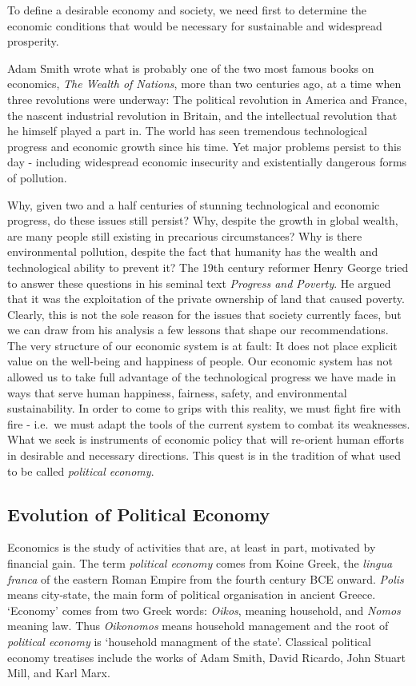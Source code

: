 \documentclass[]{tufte-handout}
\begin{document}
To define a desirable economy and society, we need first to determine
the economic conditions that would be necessary for sustainable and
widespread prosperity.

Adam Smith wrote what is probably one of the two most famous books on
economics, \emph{The Wealth of Nations}, more than two centuries ago, at
a time when three revolutions were underway: The political revolution in
America and France, the nascent industrial revolution in Britain, and
the intellectual revolution that he himself played a part in. The world
has seen tremendous technological progress and economic growth since his
time. Yet major problems persist to this day - including widespread
economic insecurity and existentially dangerous forms of pollution.

Why, given two and a half centuries of stunning technological and
economic progress, do these issues still persist? Why, despite the
growth in global wealth, are many people still existing in precarious
circumstances? Why is there environmental pollution, despite the fact
that humanity has the wealth and technological ability to prevent it?
The 19th century reformer Henry George tried to answer these questions
in his seminal text \emph{Progress and Poverty}. He argued that it was
the exploitation of the private ownership of land that caused poverty.
Clearly, this is not the sole reason for the issues that society
currently faces, but we can draw from his analysis a few lessons that
shape our recommendations. The very structure of our economic system is
at fault: It does not place explicit value on the well-being and
happiness of people. Our economic system has not allowed us to take full
advantage of the technological progress we have made in ways that serve
human happiness, fairness, safety, and environmental sustainability. In
order to come to grips with this reality, we must fight fire with fire -
i.e.~we must adapt the tools of the current system to combat its
weaknesses. What we seek is instruments of economic policy that will
re-orient human efforts in desirable and necessary directions. This
quest is in the tradition of what used to be called \emph{political
economy}.

\hypertarget{evolution-of-political-economy}{%
\subsection{Evolution of Political
Economy}\label{evolution-of-political-economy}}

Economics is the study of activities that are, at least in part,
motivated by financial gain. The term \emph{political economy} comes
from Koine Greek, the \emph{lingua franca} of the eastern Roman Empire
from the fourth century BCE onward. \emph{Polis} means city-state, the
main form of political organisation in ancient Greece. `Economy' comes
from two Greek words: \emph{Oikos}, meaning household, and \emph{Nomos}
meaning law. Thus \emph{Oikonomos} means household management and the
root of \emph{political economy} is `household managment of the state'.
Classical political economy treatises include the works of Adam Smith,
David Ricardo, John Stuart Mill, and Karl Marx.
\end{document}
